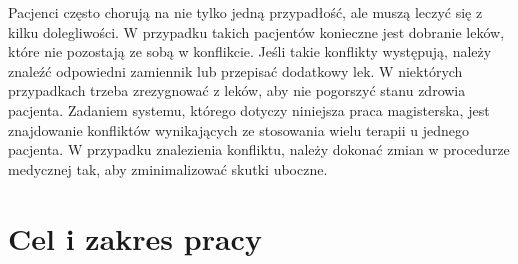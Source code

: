 \begin{spacing}{1.5}
Pacjenci często chorują na nie tylko jedną przypadłość, ale muszą leczyć się z kilku dolegliwości. W przypadku takich pacjentów konieczne jest dobranie leków, które nie pozostają ze sobą w konflikcie. 
Jeśli takie konflikty występują, należy znaleźć odpowiedni zamiennik lub przepisać dodatkowy lek. W niektórych przypadkach trzeba zrezygnować z leków, aby nie pogorszyć stanu zdrowia pacjenta. Zadaniem systemu, którego dotyczy niniejsza praca magisterska, jest znajdowanie konfliktów wynikających ze stosowania wielu terapii u jednego pacjenta. 
W przypadku znalezienia konfliktu, należy dokonać zmian w procedurze medycznej tak, aby zminimalizować skutki uboczne. 


\section{Cel i zakres pracy}



\end{spacing}
